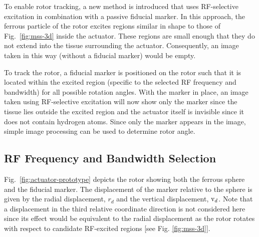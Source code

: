 \documentclass[journal]{IEEEtran}
\begin{document}
To enable rotor tracking, a new method is introduced that uses RF-selective excitation in combination with a passive fiducial marker. In this approach, the ferrous particle of the rotor excites regions similar in shape to those of Fig.\ \ref{fig:mss-3d} inside the actuator. These regions are small enough that they do not extend into the tissue surrounding the actuator. Consequently, an image taken in this way (without a fiducial marker) would be empty. 

To track the rotor, a fiducial marker is positioned on the rotor such that it is located within the excited region (specific to the  selected RF frequency and bandwidth) for all possible rotation angles. With the marker in place, an image taken using RF-selective excitation will now show only the marker since the tissue lies outside the excited region and the actuator itself is invisible since it does not contain hydrogen atoms. Since only the marker appears in the image, simple image processing can be used to determine rotor angle.

\subsection{RF Frequency and Bandwidth Selection}

Fig.\ \ref{fig:actuator-prototype} depicts the rotor showing both the ferrous sphere and the fiducial marker. The displacement of the marker relative to the sphere is given by the radial displacement, $r_d$ and the vertical displacement, $\textnormal{v}_d$. Note that a displacement in the third relative coordinate direction is not considered here since its effect would be equivalent to the radial displacement as the rotor rotates with respect to candidate RF-excited regions [see Fig. \ref{fig:mss-3d}].
\end{document}
